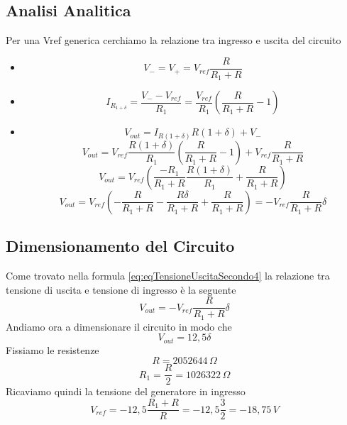 \subsection{Analisi Analitica}\label{subsec:analisiAnaliticaSecondo}
Per una Vref generica cerchiamo la relazione tra ingresso e uscita del circuito
\begin{itemize}
\item 
    \begin{equation}\label{eq:eqMorsettiAmplificatoreSecondo}
    V_{-} = V_{+} = V_{ref} \dfrac{R}{R_{1} + R}
    \end{equation}
\item 
    \begin{equation}\label{eq:eqCorrenteRSecondo}
    I_{R_{1+\delta}} = \dfrac{V_{-} - V_{ref}}{R_{1}} = \dfrac{V_{ref}}{R_{1}} ( \dfrac{R}{R_{1} + R} - 1 )
    \end{equation}
\item
    \begin{equation}\label{eq:eqTensioneUscitaSecondo1}
    V_{out} = I_{R(1+\delta)} R(1+\delta) + V_{-}
    \end{equation}
    \begin{equation}\label{eq:eqTensioneUscitaSecondo2}
    V_{out} = V_{ref} \dfrac{R(1+\delta)}{R_{1}}(\dfrac{R}{R_{1} + R} - 1) + V_{ref} \dfrac{R}{R_{1} + R}
    \end{equation}
    \begin{equation}\label{eq:eqTensioneUscitaSecondo3}
    V_{out} = V_{ref} (\dfrac{-R_{1}}{R_{1} + R} \dfrac{R(1+\delta)}{R_{1}} + \dfrac{R}{R_{1} + R})  
    \end{equation}
    \begin{equation}\label{eq:eqTensioneUscitaSecondo4}
    V_{out} = V_{ref} (-\dfrac{R}{R_{1} + R} -\dfrac{R\delta}{R_{1} + R} + \dfrac{R}{R_{1} + R}) = - V_{ref} \dfrac{R}{R_{1} + R} \delta 
    \end{equation}
\end{itemize}

\subsection{Dimensionamento del Circuito}\label{subsec:dimensionamentoCircuito}
Come trovato nella formula \ref{eq:eqTensioneUscitaSecondo4} la relazione tra tensione di uscita e tensione di ingresso è la seguente $$V_{out} = - V_{ref} \dfrac{R}{R_{1} + R} \delta$$
Andiamo ora a dimensionare il circuito in modo che $$V_{out} = 12,5 \delta$$
Fissiamo le resistenze
$$R = 2052644 \hspace{2pt} \Omega$$
$$R_{1} = \dfrac{R}{2} = 1026322 \hspace{2pt} \Omega$$
Ricaviamo quindi la tensione del generatore in ingresso
\begin{equation}\label{eq:eqTensioneIngresso}
V_{ref} = -12,5\dfrac{R_{1} + R}{R} = -12,5\dfrac{3}{2} = -18,75\hspace{2pt}V
\end{equation}


